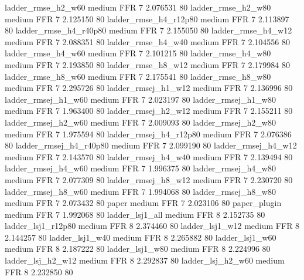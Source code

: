     ladder_rmse_h2_w60     medium      FFR                 7 2.076531 80
    ladder_rmse_h2_w80     medium      FFR                 7 2.125150 80
 ladder_rmse_h4_r12p80     medium      FFR                 7 2.113897 80
 ladder_rmse_h4_r40p80     medium      FFR                 7 2.155050 80
    ladder_rmse_h4_w12     medium      FFR                 7 2.088351 80
    ladder_rmse_h4_w40     medium      FFR                 7 2.104556 80
    ladder_rmse_h4_w60     medium      FFR                 7 2.101215 80
    ladder_rmse_h4_w80     medium      FFR                 7 2.193850 80
    ladder_rmse_h8_w12     medium      FFR                 7 2.179984 80
    ladder_rmse_h8_w60     medium      FFR                 7 2.175541 80
    ladder_rmse_h8_w80     medium      FFR                 7 2.295726 80
   ladder_rmsej_h1_w12     medium      FFR                 7 2.136996 80
   ladder_rmsej_h1_w60     medium      FFR                 7 2.023197 80
   ladder_rmsej_h1_w80     medium      FFR                 7 1.963400 80
   ladder_rmsej_h2_w12     medium      FFR                 7 2.155211 80
   ladder_rmsej_h2_w60     medium      FFR                 7 2.009093 80
   ladder_rmsej_h2_w80     medium      FFR                 7 1.975594 80
ladder_rmsej_h4_r12p80     medium      FFR                 7 2.076386 80
ladder_rmsej_h4_r40p80     medium      FFR                 7 2.099190 80
   ladder_rmsej_h4_w12     medium      FFR                 7 2.143570 80
   ladder_rmsej_h4_w40     medium      FFR                 7 2.139494 80
   ladder_rmsej_h4_w60     medium      FFR                 7 1.996375 80
   ladder_rmsej_h4_w80     medium      FFR                 7 2.077309 80
   ladder_rmsej_h8_w12     medium      FFR                 7 2.230720 80
   ladder_rmsej_h8_w60     medium      FFR                 7 1.994068 80
   ladder_rmsej_h8_w80     medium      FFR                 7 2.073432 80
                 paper     medium      FFR                 7 2.023106 80
          paper_plugin     medium      FFR                 7 1.992068 80
       ladder_lsj1_all     medium      FFR                 8 2.152735 80
    ladder_lsj1_r12p80     medium      FFR                 8 2.374460 80
       ladder_lsj1_w12     medium      FFR                 8 2.144257 80
       ladder_lsj1_w40     medium      FFR                 8 2.265882 80
       ladder_lsj1_w60     medium      FFR                 8 2.187222 80
       ladder_lsj1_w80     medium      FFR                 8 2.224996 80
     ladder_lsj_h2_w12     medium      FFR                 8 2.292837 80
     ladder_lsj_h2_w60     medium      FFR                 8 2.232850 80
